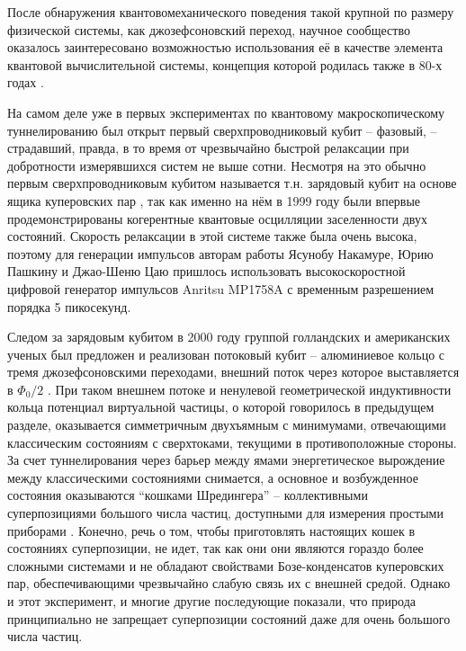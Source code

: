 \documentclass[14pt, a4paper]{extreport}
\numberwithin{equation}{section}
\begin{document}
После обнаружения квантовомеханического поведения такой крупной по размеру физической системы, как джозефсоновский переход, научное сообщество оказалось заинтересовано возможностью использования её в качестве элемента квантовой вычислительной системы, концепция которой родилась также в 80-х годах \cite{manin1980, feynman1982simulating}. 

На самом деле уже в первых экспериментах по квантовому макроскопическому туннелированию был открыт первый сверхпроводниковый кубит -- фазовый, -- страдавший, правда, в то время от чрезвычайно быстрой релаксации при добротности измерявшихся систем не выше сотни. Несмотря на это обычно первым сверхпроводниковым кубитом называется т.н. зарядовый кубит на основе ящика куперовских пар \cite{nakamura1999coherent}, так как именно на нём в 1999 году были впервые продемонстрированы когерентные квантовые осцилляции заселенности двух состояний. Скорость релаксации в этой системе также была очень высока, поэтому для генерации импульсов авторам работы Ясунобу Накамуре, Юрию Пашкину и Джао-Шеню Цаю пришлось использовать высокоскоростной цифровой генератор импульсов Anritsu MP1758A с временным разрешением порядка 5 пикосекунд. 

Следом за зарядовым кубитом в 2000 году группой голландских и американских ученых был предложен и реализован потоковый кубит -- алюминиевое кольцо с тремя джозефсоновскими переходами, внешний поток через которое выставляется в $ \Phi_0/2 $ \cite{van2000quantum}. При таком внешнем потоке и ненулевой геометрической индуктивности кольца потенциал виртуальной частицы, о которой говорилось в предыдущем разделе, оказывается симметричным двухъямным с минимумами, отвечающими классическим состояниям с сверхтоками, текущими в противоположные стороны. За счет туннелирования через барьер между ямами энергетическое вырождение между классическими состояниями снимается, а основное и возбужденное состояния оказываются  ``кошками Шредингера'' -- коллективными суперпозициями большого числа частиц, доступными для измерения простыми приборами \cite{korsbakken2010size}. Конечно, речь о том, чтобы приготовлять настоящих кошек в состояниях суперпозиции, не идет, так как они они являются гораздо более сложными системами и не обладают свойствами Бозе-конденсатов куперовских пар, обеспечивающими чрезвычайно слабую связь их с внешней средой. Однако и этот эксперимент, и многие другие последующие показали, что природа принципиально не запрещает суперпозиции состояний даже для очень большого числа частиц.
\end{document}
